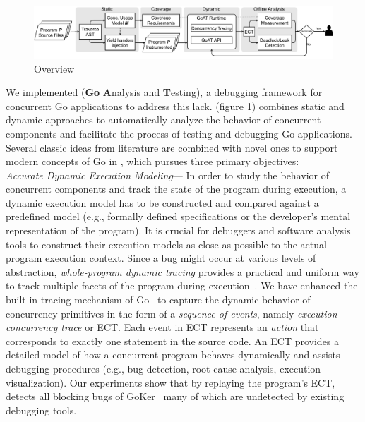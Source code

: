 \begin{figure}[t]
\centering
\includegraphics[width=0.99\linewidth]{goat/figs/GOAT_overview.pdf}
\caption{\goat Overview}
\label{fig:goat_workflow}
\end{figure}


We implemented \goat (\textbf{Go} \textbf{A}nalysis and \textbf{T}esting), a debugging framework for concurrent Go applications to address this lack.
%
\goat (figure \ref{fig:goat_workflow}) combines static and dynamic approaches to automatically analyze the behavior of concurrent components and facilitate the process of testing and debugging Go applications.
%
%
Several classic ideas from literature are combined with novel ones to support modern concepts of Go in \goat, which pursues three primary objectives:
\\
 \textit{Accurate Dynamic Execution Modeling}---
In order to study the behavior of concurrent components and track the state of the program during execution, a dynamic execution model has to be constructed and compared against a predefined model (e.g., formally defined specifications or the developer's mental representation of the program).
%
It is crucial for debuggers and software analysis tools to construct their execution models as close as possible to the actual program execution context.
%
Since a bug might occur at various levels of abstraction, \textit{whole-program dynamic tracing} provides a practical and uniform way to track multiple facets of the program during execution~\cite{diffTrace}.
%
We have enhanced the built-in tracing mechanism of Go~\cite{ect-arxiv} to capture the dynamic behavior of concurrency primitives in the form of a \textit{sequence of events}, namely \textit{execution concurrency trace} or ECT.
%
Each event in ECT represents an \textit{action} that corresponds to exactly one statement in the source code.
%
An ECT provides a detailed model of how a concurrent program behaves dynamically and assists debugging procedures (e.g., bug detection, root-cause analysis, execution visualization).
%
Our experiments show that by replaying the program's ECT, \goat detects all blocking bugs of GoKer~\cite{yuan-gobench-cgo21} many of which are undetected by existing debugging tools.
